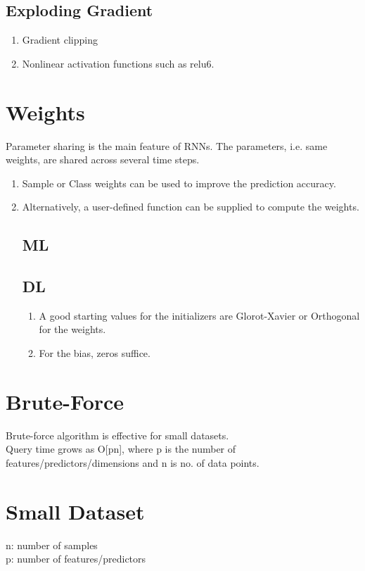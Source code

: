 \documentclass[a4paper, 12pt]{report}
\begin{document}
\subsection{Exploding Gradient}
\begin{enumerate}
\item Gradient clipping
\item Nonlinear activation functions such as relu6.
\end{enumerate}


\section{Weights}
Parameter sharing is the main feature of RNNs. The parameters, i.e. same weights, are shared across several time steps.
\label{sec:weights}
\begin{enumerate}
\item Sample or Class weights can be used to improve the prediction accuracy.
\item Alternatively, a user-defined function can be supplied to compute the weights.

\subsection{ML}

\subsection{DL}
\begin{enumerate}
\item A good starting values for the initializers are Glorot-Xavier or Orthogonal for the weights.
\item For the bias, zeros suffice.
\end{enumerate}
\end{enumerate}



\section{Brute-Force}
\label{sec:bruteforce}

Brute-force algorithm is effective for small datasets.\\
Query time grows as O[pn], where p is the number of features/predictors/dimensions and n is no. of data points.

\section{Small Dataset}
\label{sec:smalldatasize}
n: number of samples\\
p: number of features/predictors
\end{document}
